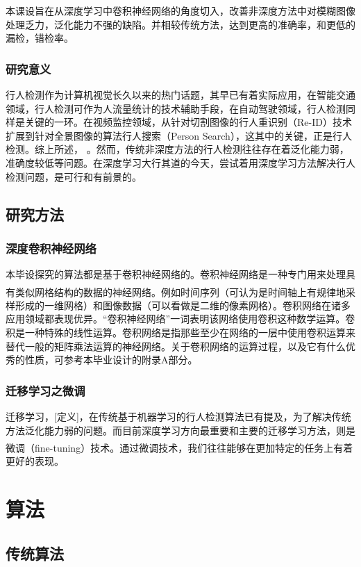 \documentclass[12pt,a4paper,titlepage]{article}
\newcommand{\upcite}[1]{\textsuperscript{\textsuperscript{\cite{#1}}}}  %
\begin{document}
本课设旨在从深度学习中卷积神经网络的角度切入，改善非深度方法中对模糊图像处理乏力，泛化能力不强的缺陷。并相较传统方法，达到更高的准确率，和更低的漏检，错检率。 
\subsubsection{研究意义}
行人检测作为计算机视觉长久以来的热门话题，其早已有着实际应用，在智能交通领域，行人检测可作为人流量统计的技术辅助手段，在自动驾驶领域，行人检测同样是关键的一环。在视频监控领域，从针对切割图像的行人重识别（Re-ID）技术扩展到针对全景图像的算法行人搜索（Person Search），这其中的关键，正是行人检测。综上所述， 。然而，传统非深度方法的行人检测往往存在着泛化能力弱，准确度较低等问题。在深度学习大行其道的今天，尝试着用深度学习方法解决行人检测问题，是可行和有前景的。

\subsection{研究方法}
\subsubsection{深度卷积神经网络}
本毕设探究的算法都是基于卷积神经网络的。卷积神经网络是一种专门用来处理具有类似网格结构的数据的神经网络\upcite{Goodfellow-et-al-2016-201}。例如时间序列（可认为是时间轴上有规律地采样形成的一维网格）和图像数据（可以看做是二维的像素网格）。卷积网络在诸多应用领域都表现优异。“卷积神经网络”一词表明该网络使用卷积这种数学运算。卷积是一种特殊的线性运算。卷积网络是指那些至少在网络的一层中使用卷积运算来替代一般的矩阵乘法运算的神经网络。关于卷积网络的运算过程，以及它有什么优秀的性质，可参考本毕业设计的附录A部分。

\subsubsection{迁移学习之微调}
迁移学习，[定义]，在传统基于机器学习的行人检测算法已有提及，为了解决传统方法泛化能力弱的问题。而目前深度学习方向最重要和主要的迁移学习方法，则是微调（fine-tuning）技术\upcite{yosinski2014transferable}。通过微调技术，我们往往能够在更加特定的任务上有着更好的表现。


\section{算法}
\subsection{传统算法}
\end{document}
